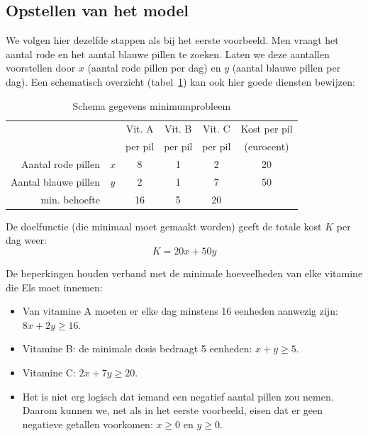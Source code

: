 \subsection{Opstellen van het model}

We volgen hier dezelfde stappen als bij het eerste voorbeeld.
Men vraagt het aantal rode en het aantal blauwe pillen te zoeken.
Laten we deze aantallen voorstellen door $x$ (aantal rode
pillen per dag) en $y$ (aantal blauwe pillen per dag).
Een schematisch overzicht (tabel~\ref{tbl:minschema})
kan ook hier goede diensten bewijzen:


\begin{table}[hbp]
    \centering
    \caption{Schema gegevens minimumprobleem}
    \begin{tabular}{rccccc}
    \toprule
       & & Vit. A  & Vit. B & Vit. C & Kost per pil  \\
       & & per pil & per pil& per pil&  (eurocent)  \\
    \midrule
    Aantal rode pillen & $x$ & 8 & 1 & 2 & 20  \\
    Aantal blauwe pillen & $y$ & 2 & 1 & 7 & 50  \\
\cmidrule{3-5}
    min. behoefte &  & 16 & 5 & 20 &   \\
    \bottomrule
\end{tabular}
    \label{tbl:minschema}
\end{table}

De doelfunctie (die minimaal moet gemaakt worden) geeft de totale
kost $K$ per dag weer:
\begin{displaymath}
    K=20x + 50y
\end{displaymath}

De beperkingen houden verband met de minimale hoeveelheden van
elke vitamine die Els moet innemen:
\begin{itemize}
    \item  Van vitamine A moeten er elke dag minstens 16 eenheden aanwezig
zijn: $8x + 2y \geqslant 16$.

    \item  Vitamine B: de minimale dosis  bedraagt 5 eenheden: $x+y\geqslant 5$.

    \item  Vitamine C: $2x + 7y \geqslant 20$.

    \item  Het is niet erg logisch dat iemand een negatief aantal pillen
zou nemen. Daarom kunnen we, net als in het eerste voorbeeld,
eisen dat er geen negatieve getallen voorkomen: $x\geqslant 0$
en $y \geqslant 0$.
\end{itemize}



